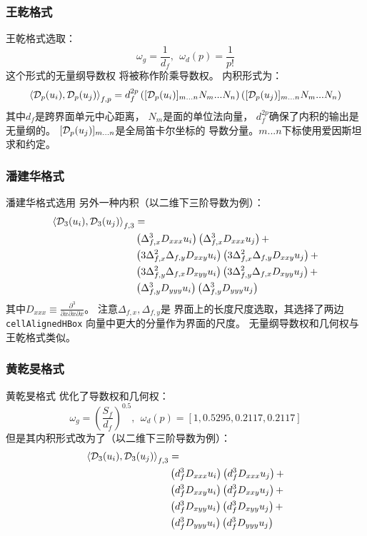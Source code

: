 \documentclass[UTF8,zihao=5]{ctexart} %
\newcommand*{\pd}[2]{\frac{\partial #1}{\partial #2}}
\newcommand*{\inc}[0]{{\Delta}}
\begin{document}
\subsubsection{王乾格式}

王乾格式\cite{wang2017compact3}选取：
$$
    \omega_g = \frac{1}{d_f},\ \ \omega_d(p) =  \frac{1}{p!}
$$
这个形式的无量纲导数权
将被称作阶乘导数权。
内积形式为：
$$
    \left\langle\mathcal{D}_p(u_i),\mathcal{D}_p(u_j)\right\rangle_{f,p}
    =d_f^{2p}
    \left([\mathcal{D}_p(u_i)]_{m...n}N_m... N_n\right)
    \left([\mathcal{D}_p(u_j)]_{m...n}N_m... N_n\right)
$$
其中$d_f$是跨界面单元中心距离，
$N_m$是面的单位法向量，
$d_f^{2p}$确保了内积的输出是无量纲的。
$[\mathcal{D}_p(u_j)]_{m...n}$是全局笛卡尔坐标的
导数分量。$m...n$下标使用爱因斯坦求和约定。

\subsubsection{潘建华格式}

潘建华格式\cite{jianhua2018high}选用
另外一种内积（以二维下三阶导数为例）：
$$
    \begin{aligned}
        \inner{\D_3(u_i),\D_3(u_j)}_{f,3}
         & = \\
         &
        \left(\inc_{f,x}^3 D_{xxx}u_i\right)
        \left(\inc_{f,x}^3 D_{xxx}u_j\right)
        +    \\
         &
        \left(3\inc_{f,x}^2\inc_{f,y} D_{xxy}u_i\right)
        \left(3\inc_{f,x}^2\inc_{f,y} D_{xxy}u_j\right)
        +    \\
         &
        \left(3\inc_{f,y}^2\inc_{f,x} D_{xyy}u_i\right)
        \left(3\inc_{f,y}^2\inc_{f,x} D_{xyy}u_j\right)
        +    \\
         &
        \left(\inc_{f,y}^3 D_{yyy}u_i\right)
        \left(\inc_{f,y}^3 D_{yyy}u_j\right)
    \end{aligned}
$$
其中$D_{xxx}\equiv \pd{^3}{x\partial x\partial x}$。
注意$\inc_{f,x}, \inc_{f,y}$是
界面上的长度尺度选取，其选择了两边\verb|cellAlignedHBox|
向量中更大的分量作为界面的尺度。
无量纲导数权和几何权与王乾格式类似。

\subsubsection{黄乾旻格式}

黄乾旻格式\cite{huang2022high}
优化了导数权和几何权：
$$
    \omega_g = \left(\frac{S_f}{d_f}\right)^{0.5},
    \ \ \omega_d(p) =  [1, 0.5295, 0.2117, 0.2117]
$$
但是其内积形式改为了（以二维下三阶导数为例）：
$$
    \begin{aligned}
        \left\langle\mathcal{D}_3(u_i),\mathcal{D}_3(u_j)\right\rangle_{f,3}
         & = \\
         &
        \left(d_f^3 D_{xxx}u_i\right)
        \left(d_f^3 D_{xxx}u_j\right)
        +    \\
         &
        \left(d_f^3 D_{xxy}u_i\right)
        \left(d_f^3 D_{xxy}u_j\right)
        +    \\
         &
        \left(d_f^3 D_{xyy}u_i\right)
        \left(d_f^3 D_{xyy}u_j\right)
        +    \\
         &
        \left(d_f^3 D_{yyy}u_i\right)
        \left(d_f^3 D_{yyy}u_j\right)
    \end{aligned}
$$
\end{document}
